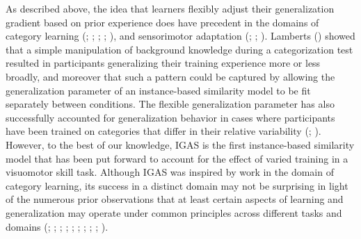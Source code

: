 \documentclass[
  11pt,
  letterpaper,
]{article}
\begin{document}
As described above, the idea that learners flexibly adjust their
generalization gradient based on prior experience does have precedent in
the domains of category learning
(;
; ; ; ), and sensorimotor adaptation
(;
; ). Lamberts
() showed that
a simple manipulation of background knowledge during a categorization
test resulted in participants generalizing their training experience
more or less broadly, and moreover that such a pattern could be captured
by allowing the generalization parameter of an instance-based similarity
model to be fit separately between conditions. The flexible
generalization parameter has also successfully accounted for
generalization behavior in cases where participants have been trained on
categories that differ in their relative variability
(;
). However, to the best of our knowledge, IGAS is the first
instance-based similarity model that has been put forward to account for
the effect of varied training in a visuomotor skill task. Although IGAS
was inspired by work in the domain of category learning, its success in
a distinct domain may not be surprising in light of the numerous prior
observations that at least certain aspects of learning and
generalization may operate under common principles across different
tasks and domains (; ;
; ; ;
; ;
; ; ).
\end{document}
